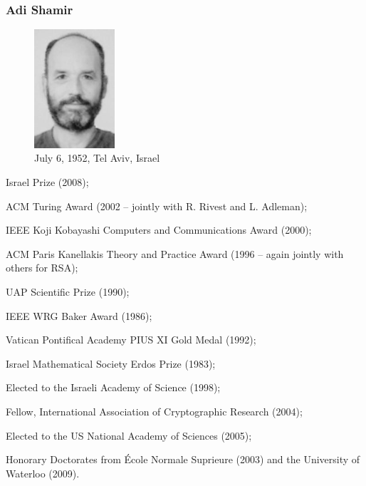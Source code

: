 \documentclass[slidestop,compress,mathserif]{beamer}
\begin{document}
\begin{frame}
  \frametitle{Adi Shamir}
  \begin{multicols}{2}
    \begin{minipage}[c]{0.5\textwidth}
      \begin{figure}[H]
        \includegraphics[width=3cm]{Shamir.jpg}
        \caption{July 6, 1952, Tel Aviv, Israel}
      \end{figure}
    \end{minipage}
    \footnotesize
    Israel Prize (2008); 
    
    ACM Turing Award (2002 – jointly with R. Rivest and L. Adleman);
    
    IEEE Koji Kobayashi Computers and Communications Award (2000); 
    
    ACM Paris Kanellakis Theory and Practice Award (1996 – again jointly with others for RSA); 
    
    UAP Scientific Prize (1990); 
    
    IEEE WRG Baker Award (1986); 
    
    Vatican Pontifical Academy PIUS XI Gold Medal (1992); 
    
    Israel Mathematical Society Erdos Prize (1983); 
    
    Elected to the Israeli Academy of Science (1998); 
    
    Fellow, International Association of Cryptographic Research (2004); 
    
    Elected to the US National Academy of Sciences (2005); 
    
    Honorary Doctorates from École Normale Suprieure (2003) and the University of Waterloo (2009).    
  \end{multicols}
  
\end{frame}
\end{document}
